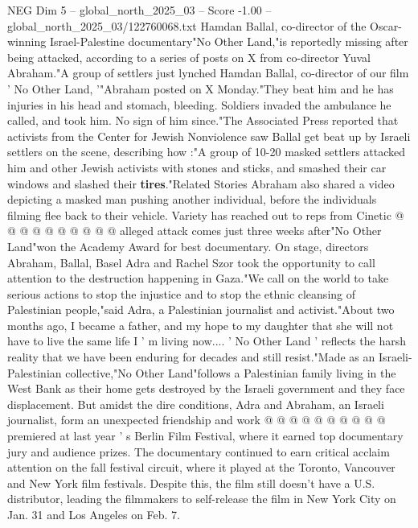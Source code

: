 \begin{textsample}{NEG Dim 5 – global\_north\_2025\_03 – Score -1.00 – global\_north\_2025\_03/122760068.txt}  \label{ex:f5_neg_252}
Hamdan Ballal, co-director of the Oscar-winning Israel-Palestine documentary"No Other Land,"is reportedly missing after being attacked, according to a series of posts on X from co-director Yuval Abraham."A group of settlers just lynched Hamdan Ballal, co-director of our film ' No Other Land, '"Abraham posted on X Monday."They beat him and he has injuries in his head and stomach, bleeding.
Soldiers invaded the ambulance he called, and took him.
No sign of him since."The Associated Press reported that activists from the Center for Jewish Nonviolence saw Ballal get beat up by Israeli settlers on the scene, describing how :"A group of 10-20 masked settlers attacked him and other Jewish activists with stones and sticks, and smashed their car windows and slashed their \textbf{tires}."Related Stories Abraham also shared a video depicting a masked man pushing another individual, before the individuals filming flee back to their vehicle.
Variety has reached out to reps from Cinetic @ @ @ @ @ @ @ @ @ @ alleged attack comes just three weeks after"No Other Land"won the Academy Award for best documentary.
On stage, directors Abraham, Ballal, Basel Adra and Rachel Szor took the opportunity to call attention to the destruction happening in Gaza."We call on the world to take serious actions to stop the injustice and to stop the ethnic cleansing of Palestinian people,"said Adra, a Palestinian journalist and activist."About two months ago, I became a father, and my hope to my daughter that she will not have to live the same life I ' m living now.... ' No Other Land ' reflects the harsh reality that we have been enduring for decades and still resist."Made as an Israeli-Palestinian collective,"No Other Land"follows a Palestinian family living in the West Bank as their home gets destroyed by the Israeli government and they face displacement.
But amidst the dire conditions, Adra and Abraham, an Israeli journalist, form an unexpected friendship and work @ @ @ @ @ @ @ @ @ @ premiered at last year ' s Berlin Film Festival, where it earned top documentary jury and audience prizes.
The documentary continued to earn critical acclaim attention on the fall festival circuit, where it played at the Toronto, Vancouver and New York film festivals.
Despite this, the film still doesn't have a U.S. distributor, leading the filmmakers to self-release the film in New York City on Jan. 31 and Los Angeles on Feb. 7.

\end{textsample}
